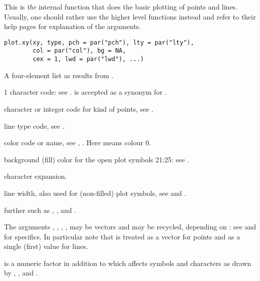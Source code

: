 %
\begin{Description}\relax
This is \emph{the} internal function that does the basic plotting of
points and lines.  Usually, one should rather use the higher level
functions instead and refer to their help pages for explanation of the
arguments.
\end{Description}
%
\begin{Usage}
\begin{verbatim}
plot.xy(xy, type, pch = par("pch"), lty = par("lty"),
        col = par("col"), bg = NA,
        cex = 1, lwd = par("lwd"), ...)
\end{verbatim}
\end{Usage}
%
\begin{Arguments}
\begin{ldescription}
\item[\code{xy}] A four-element list as results from
.
\item[\code{type}] 1 character code: see .
 is accepted as a synonym for .
\item[\code{pch}] character or integer code for kind of points, see
.
\item[\code{lty}] line type code, see .
\item[\code{col}] color code or name, see ,
.  Here  means colour 0.
\item[\code{bg}] background (fill) color for the open plot symbols 21:25:
see .
\item[\code{cex}] character expansion.
\item[\code{lwd}] line width, also used for (non-filled) plot symbols, see
 and .
\item[\code{...}] further  such as ,
,  and .
\end{ldescription}
\end{Arguments}
%
\begin{Details}\relax
The arguments , , , ,
 may be vectors and may be recycled, depending on
: see  and  for
specifics.  In particular note that  is treated as a vector
for points and as a single (first) value for lines.

 is a numeric factor in addition to  which
affects symbols and characters as drawn by  ,
,  and .
\end{Details}
